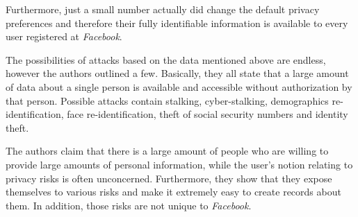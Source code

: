 Furthermore, just a small number actually did change the default privacy
preferences and therefore their fully identifiable information is available to
every user registered at \textit{Facebook}.

The possibilities of attacks based on the data mentioned above are endless,
however the authors outlined a few. Basically, they all state that a large
amount of data about a single person is available and accessible without
authorization by that person. Possible attacks contain stalking,
cyber-stalking, demographics re-identification, face re-identification, theft
of social security numbers and identity theft.

The authors claim that there is a large amount of people who are willing to
provide large amounts of personal information, while the user's notion relating
to privacy risks is often unconcerned. Furthermore, they show that they expose
themselves to various risks and make it extremely easy to create records about
them. In addition, those risks are not unique to \textit{Facebook}.
